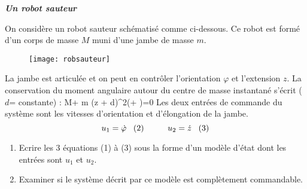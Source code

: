 \vspace*{2mm}
\begin{exercice}{\bf \em Un robot sauteur}


On considère un \og robot sauteur \fg \; schématisé comme ci-dessous.
Ce robot est formé d'un corps de masse $M$ muni d'une jambe de
masse $m$.  
\begin{figure}[h]
\begin{center}
\texttt{[image: robsauteur]}
\end{center}
\end{figure}

\noindent La jambe est articulée et on peut en contr\^oler
l'orientation $\varphi$ et l'extension
$z$.
La conservation du moment angulaire autour du centre de masse instantané
s'écrit ($d$= constante) :
\eqnn
M\dot \theta + m (z + d)^2(\dot\theta + \dot \varphi)=0
\eeqnn
Les deux entrées de commande du système sont les vitesses d'orientation et
d'élongation de la jambe.
$$
u_1 = \dot \varphi \;\;\; (2) \hspace*{1cm} u_2 = \dot z \;\;\; (3)
$$
\begin{enumerate}
\item Ecrire les 3 équations (1) à (3) sous la forme d'un modèle d'état
dont les entrées sont $u_1$ et $u_2$.
\item Examiner si le système décrit par ce modèle est complètement
commandable.
\end{enumerate}

\end{exercice}

 

